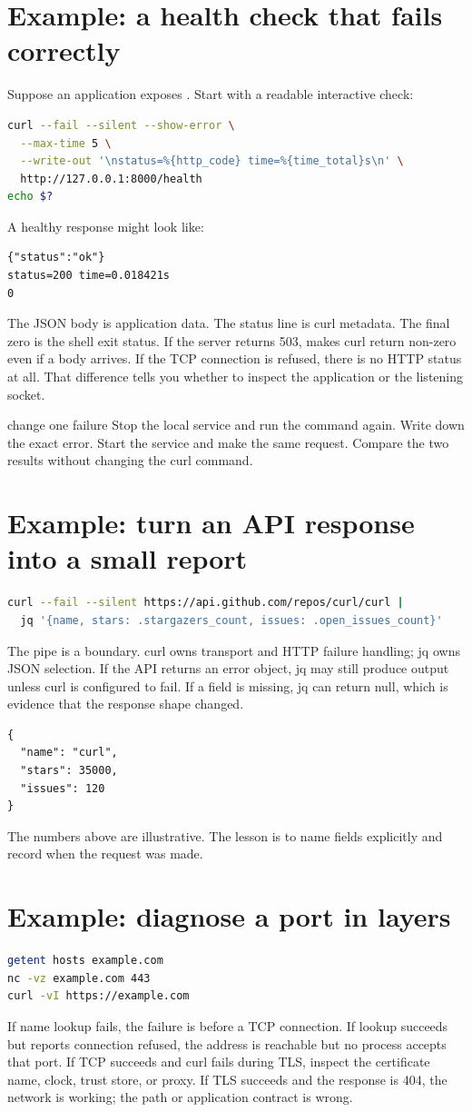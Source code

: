 \documentclass[11pt,a4paper,openany]{book}
\newcommand{\command}[1]{\texttt{\small\detokenize{#1}}}
\begin{document}
\section{Example: a health check that fails correctly}
Suppose an application exposes \command{/health}. Start with a readable interactive check:
\begin{lstlisting}[language=bash]
curl --fail --silent --show-error \
  --max-time 5 \
  --write-out '\nstatus=%{http_code} time=%{time_total}s\n' \
  http://127.0.0.1:8000/health
echo $?
\end{lstlisting}
A healthy response might look like:
\begin{lstlisting}
{"status":"ok"}
status=200 time=0.018421s
0
\end{lstlisting}
The JSON body is application data. The status line is curl metadata. The final zero is the shell exit status. If the server returns 503, \command{--fail} makes curl return non-zero even if a body arrives. If the TCP connection is refused, there is no HTTP status at all. That difference tells you whether to inspect the application or the listening socket.
\begin{trybox}{change one failure}
Stop the local service and run the command again. Write down the exact error. Start the service and make the same request. Compare the two results without changing the curl command.
\end{trybox}
\section{Example: turn an API response into a small report}
\begin{lstlisting}[language=bash]
curl --fail --silent https://api.github.com/repos/curl/curl |
  jq '{name, stars: .stargazers_count, issues: .open_issues_count}'
\end{lstlisting}
The pipe is a boundary. curl owns transport and HTTP failure handling; jq owns JSON selection. If the API returns an error object, jq may still produce output unless curl is configured to fail. If a field is missing, jq can return null, which is evidence that the response shape changed.
\begin{lstlisting}
{
  "name": "curl",
  "stars": 35000,
  "issues": 120
}
\end{lstlisting}
The numbers above are illustrative. The lesson is to name fields explicitly and record when the request was made.
\section{Example: diagnose a port in layers}
\begin{lstlisting}[language=bash]
getent hosts example.com
nc -vz example.com 443
curl -vI https://example.com
\end{lstlisting}
If name lookup fails, the failure is before a TCP connection. If lookup succeeds but \command{nc} reports connection refused, the address is reachable but no process accepts that port. If TCP succeeds and curl fails during TLS, inspect the certificate name, clock, trust store, or proxy. If TLS succeeds and the response is 404, the network is working; the path or application contract is wrong.
\end{document}
